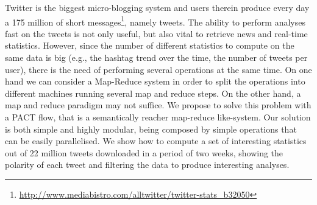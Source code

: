 Twitter is the biggest micro-blogging system and users therein produce every day a 175 million of short messages\footnote{\url{http://www.mediabistro.com/alltwitter/twitter-stats_b32050}}, namely tweets.
The ability to perform analyses fast on the tweets is not only useful, but also vital to retrieve news and real-time statistics. 
However, since the number of different statistics to compute on the same data is big (e.g., the hashtag trend over the time, the number of tweets per user), there is the need of performing several operations at the same time. 
On one hand we can consider a Map-Reduce system in order to split the operations into different machines running several map and reduce steps.
On the other hand, a map and reduce paradigm may not suffice. 
We propose to solve this problem with a PACT flow, that is a semantically reacher map-reduce like-system.
Our solution is both simple and highly modular, being composed by simple operations that can be easily parallelised. 
We show how to compute a set of interesting statistics out of 22 million tweets downloaded in a period of two weeks, showing the polarity of each tweet and filtering the data to produce interesting analyses. 

